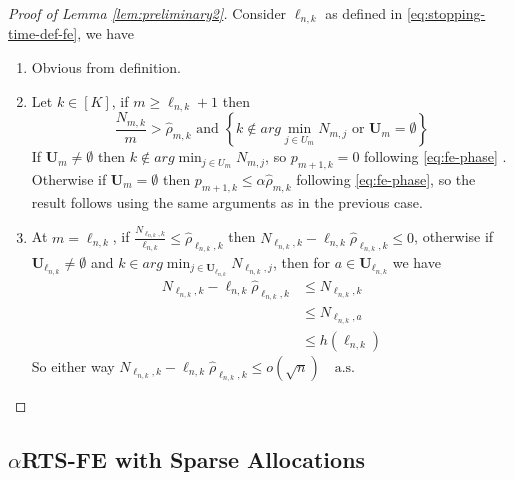 \begin{proof}[Proof of Lemma \ref{lem:preliminary2}]
	Consider \(\ell_{n,k}\) as defined in \eqref{eq:stopping-time-def-fe}, we have
	\begin{enumerate}[label=(\roman*)]
		\item Obvious from definition.
		\item Let \(k \in [K]\), if \(m \geq \ell_{n,k} + 1\) then
		\[
		\frac{N_{m,k}}{m} > \hat{\rho}_{m,k} \text{ and } \left\{k \notin arg\!\min_{j \in U_m} N_{m,j}\text{ or } \mathbf{U}_m = \emptyset\right\}
		\]
		If \(\mathbf{U}_m \neq \emptyset\) then \(k \notin arg\!\min_{j \in U_m} N_{m,j}\), so \(p_{m+1,k} = 0\) following \eqref{eq:fe-phase} . Otherwise if \(\mathbf{U}_m = \emptyset\) then \(p_{m+1,k} \leq \alpha \hat{\rho}_{m,k}\) following \eqref{eq:fe-phase}, so the result follows using the same arguments as in the previous case.
		\item At \(m = \ell_{n,k}\), if \(\frac{N_{\ell_{n,k},k}}{\ell_{n,k}} \leq \hat{\rho}_{\ell_{n,k},k}\) then \(	N_{\ell_{n,k},k} - \ell_{n,k} \hat{\rho}_{\ell_{n,k},k} \leq 0
		\),
		otherwise if \(\mathbf{U}_{\ell_{n,k}} \neq \emptyset\) and \(k \in arg\!\min_{j \in \mathbf{U}_{\ell_{n,k}}} N_{\ell_{n,k},j}\), then for \(a \in \mathbf{U}_{\ell_{n,k}}\) we have
		\begin{align*}
			N_{\ell_{n,k},k} - \ell_{n,k} \hat{\rho}_{\ell_{n,k},k}
			&\leq N_{\ell_{n,k},k}\\
			&\leq N_{\ell_{n,k},a}\\
			&\leq h(\ell_{n,k})
		\end{align*}
		So either way \(N_{\ell_{n,k},k} - \ell_{n,k} \hat{\rho}_{\ell_{n,k},k} \leq o(\sqrt{n}) \quad \text{a.s.}\)
	\end{enumerate}
\end{proof}

\subsection{$\alpha$RTS-FE with Sparse Allocations}\label{proofs:sparse-case}

